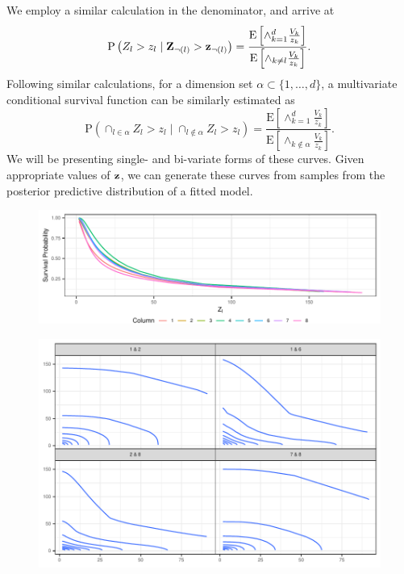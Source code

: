   We employ a similar calculation in the denominator, and arrive at
  \begin{equation}
    \label{eqn:condsurv1df}
    \text{P}\left(Z_l > z_l\mid {\bf Z}_{\neg(l)} > {\bf z}_{\neg(l)}\right) =
      \frac{\text{E}\left[\wedge_{k = 1}^d \frac{V_k}{z_k}\right]}{\text{E}\left[\wedge_{k \neq l}\frac{V_k}{z_k}\right]}.
  \end{equation}
  Following similar calculations, for a dimension set $\alpha \subset \{1,\ldots, d\}$, a multivariate
  conditional survival function can be similarly estimated as
  \begin{equation}
    \label{eqn:condsurv2df}
    \text{P}\left(\cap_{l \in \alpha} Z_l > z_l \mid \cap_{l\not\in\alpha} Z_l > z_l\right) =
      \frac{\text{E}\left[\wedge_{k = 1}^d \frac{V_k}{z_k}\right]}{\text{E}\left[\wedge_{k \not\in\alpha}\frac{V_k}{z_k}\right]}.
  \end{equation}
  We will be presenting single- and bi-variate forms of these curves.   Given appropriate values of
  ${\bf z}$, we can generate these curves from samples from the posterior predictive distribution of
  a fitted model.

\begin{figure}[h]
  \label{fig:condsurv1d}
  \includegraphics{./images/condsurv_1d}
\end{figure}

\begin{figure}[h]
  \label{fig:condsurv_2d}
  \includegraphics{./images/condsurv_2d}
\end{figure}









